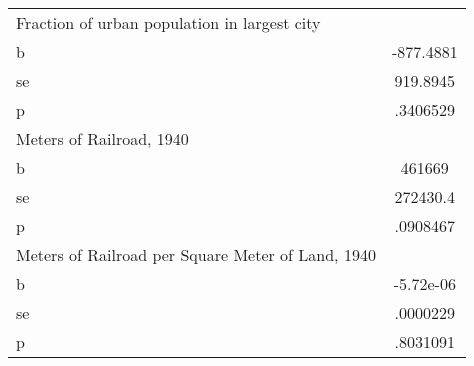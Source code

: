 \begin{tabular}{l*{1}{c}}
\midrule
Fraction of urban population in largest city&         \\
b               &-877.4881\\
se              & 919.8945\\
p               & .3406529\\
\midrule
Meters of Railroad, 1940&         \\
b               &   461669\\
se              & 272430.4\\
p               & .0908467\\
\midrule
Meters of Railroad per Square Meter of Land, 1940&         \\
b               &-5.72e-06\\
se              & .0000229\\
p               & .8031091\\
\bottomrule
\end{tabular}
